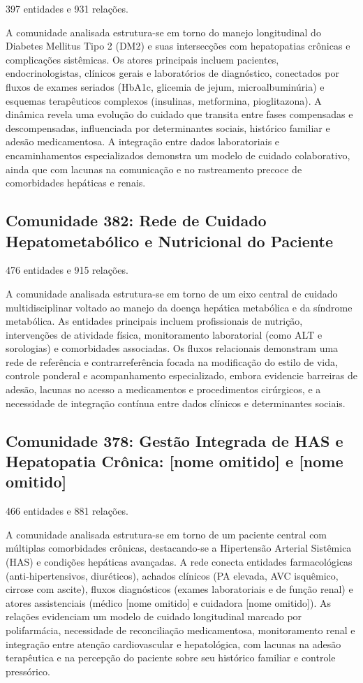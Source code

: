 {\small 397 entidades e 931 relações.}

A comunidade analisada estrutura-se em torno do manejo longitudinal do Diabetes Mellitus Tipo 2 (DM2) e suas intersecções com hepatopatias crônicas e complicações sistêmicas. Os atores principais incluem pacientes, endocrinologistas, clínicos gerais e laboratórios de diagnóstico, conectados por fluxos de exames seriados (HbA1c, glicemia de jejum, microalbuminúria) e esquemas terapêuticos complexos (insulinas, metformina, pioglitazona). A dinâmica revela uma evolução do cuidado que transita entre fases compensadas e descompensadas, influenciada por determinantes sociais, histórico familiar e adesão medicamentosa. A integração entre dados laboratoriais e encaminhamentos especializados demonstra um modelo de cuidado colaborativo, ainda que com lacunas na comunicação e no rastreamento precoce de comorbidades hepáticas e renais.

\subsection*{Comunidade 382: Rede de Cuidado Hepatometabólico e Nutricional do Paciente}

{\small 476 entidades e 915 relações.}

A comunidade analisada estrutura-se em torno de um eixo central de cuidado multidisciplinar voltado ao manejo da doença hepática metabólica e da síndrome metabólica. As entidades principais incluem profissionais de nutrição, intervenções de atividade física, monitoramento laboratorial (como ALT e sorologias) e comorbidades associadas. Os fluxos relacionais demonstram uma rede de referência e contrarreferência focada na modificação do estilo de vida, controle ponderal e acompanhamento especializado, embora evidencie barreiras de adesão, lacunas no acesso a medicamentos e procedimentos cirúrgicos, e a necessidade de integração contínua entre dados clínicos e determinantes sociais.

\subsection*{Comunidade 378: Gestão Integrada de HAS e Hepatopatia Crônica: [nome omitido] e [nome omitido]}

{\small 466 entidades e 881 relações.}

A comunidade analisada estrutura-se em torno de um paciente central com múltiplas comorbidades crônicas, destacando-se a Hipertensão Arterial Sistêmica (HAS) e condições hepáticas avançadas. A rede conecta entidades farmacológicas (anti-hipertensivos, diuréticos), achados clínicos (PA elevada, AVC isquêmico, cirrose com ascite), fluxos diagnósticos (exames laboratoriais e de função renal) e atores assistenciais (médico [nome omitido] e cuidadora [nome omitido]). As relações evidenciam um modelo de cuidado longitudinal marcado por polifarmácia, necessidade de reconciliação medicamentosa, monitoramento renal e integração entre atenção cardiovascular e hepatológica, com lacunas na adesão terapêutica e na percepção do paciente sobre seu histórico familiar e controle pressórico.

